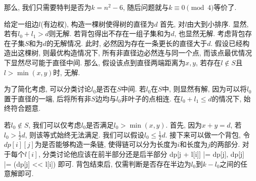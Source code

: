那么, 我们只需要特判是否为$k = n^2-6$, 随后问题就与$k \equiv 0 \pmod{4}$等价了.

\prob 给定一组边$l$(有边权), 构造一棵树使得树的直径为$d$
\sol 首先, 对$l$由大到小排序. 显然, 若有$l_0 + l_1 > d$则无解. 若背包得出不存在一组子集和为$d$, 也显然无解. 考虑背包存在子集$S$和为$d$的无解情况. 此时, 必然因为存在一条更长的直径大于$d$. 假设已经构造出这棵树, 则最优构造情况下, 所有非直径边必然连与同一个点, 而该点最优情况下显然尽可能于直径中间. 那么, 假设该点到直径两端距离为$x, y$, 若存在$l \not \in S$且$l > \min(x,y)$时, 无解.

为了简化考虑, 可以分类讨论$l_0$是否在$S$中间. 若$l_0$在$S$中, 则显然有解, 因为可以将$l_0$置于直径的一端, 后将所有非$S$边均与$l_0$非叶子的点相连. 在$l_0 + l_1 \leq d$的情况下, 始终符合题意.

若$l_0 \not \in S$, 我们可以仅考虑$l_0$是否满足$l_0 > \min(x,y)$. 首先, 因为$x + y = d$, 若$l_0 > \frac{1}{2} d$, 则该等式始终无法满足. 我们可以假设$l_0 \leq \frac{1}{2}d$. 接下来可以做一个背包, 令$dp[i][j]$为是否能够构造一条链, 使得链可以分为长度为$i$和长度为$j$的两部分. 对于每个$l[i]$, 分类讨论他应该在前半部分还是后半部分 dp[j + l[i]] |= dp[j], dp[j] |= (dp[j] << l[i]) 即可. 背包结束后, 仅需判断是否存在半边为$l_0$到$k - l_0$之间的任意解即可.